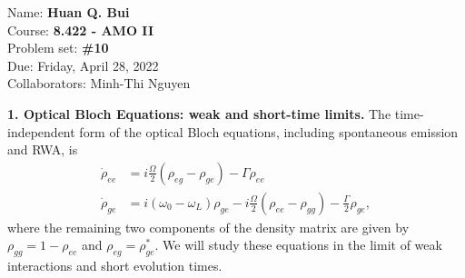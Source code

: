 \documentclass{article}
\theoremstyle{definition}
\newcommand{\f}[2]{\frac{#1}{#2}}
\begin{document}
\begin{framed}
\noindent Name: \textbf{Huan Q. Bui}\\
Course: \textbf{8.422 - AMO II}\\
Problem set: \textbf{\#10}\\
Due: Friday, April 28, 2022\\
Collaborators:  Minh-Thi Nguyen
\end{framed}
	
\noindent \textbf{1. Optical Bloch Equations: weak and short-time limits.} The time-independent form of the optical Bloch equations, including spontaneous emission and RWA, is 
\begin{align*}
\dot{\rho}_{ee} &= i \f{\Omega}{2} (\rho_{eg} - \rho_{ge}) - \Gamma \rho_{ee} \\ 
\dot{\rho}_{ge} &= i (\omega_0 - \omega_L) \rho_{ge} - i \f{\Omega}{2} (\rho_{ee} - \rho_{gg} ) - \f{\Gamma}{2} \rho_{ge},
\end{align*}
where the remaining two components of the density matrix are given by $\rho_{gg} = 1 - \rho_{ee}$ and $\rho_{eg} = \rho^*_{ge}$. We will study these equations in the limit of weak interactions and short evolution times. 
\end{document}
